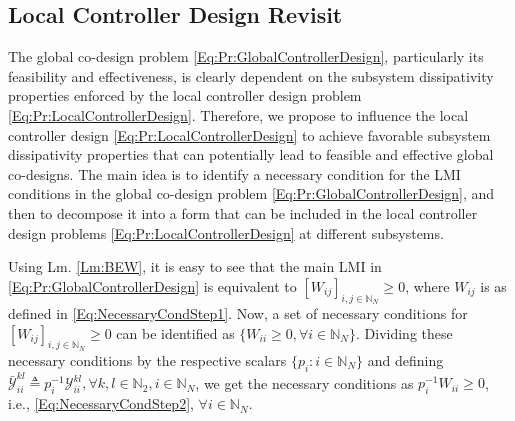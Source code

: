 \documentclass[letterpaper, 10 pt, conference]{ieeeconf}%
\newcommand{\N}{\mathbb{N}}
\newcommand{\0}{\mathbf{0}}
\newcommand{\Y}{\mathcal{Y}}
\newtheorem{remark}{\textbf{Remark}}
\begin{document}




\subsection{Local Controller Design Revisit}

The global co-design problem \eqref{Eq:Pr:GlobalControllerDesign}, particularly its feasibility and effectiveness, is clearly dependent on the subsystem dissipativity properties enforced by the local controller design problem \eqref{Eq:Pr:LocalControllerDesign}. Therefore, we propose to influence the local controller design \eqref{Eq:Pr:LocalControllerDesign} to achieve favorable subsystem dissipativity properties that can potentially lead to feasible and effective global co-designs. The main idea is to identify a necessary condition for the LMI conditions in the global co-design problem \eqref{Eq:Pr:GlobalControllerDesign}, and then to decompose it into a form that can be included in the local controller design problems \eqref{Eq:Pr:LocalControllerDesign} at different subsystems. 



Using Lm. \ref{Lm:BEW}, it is easy to see that the main LMI in \eqref{Eq:Pr:GlobalControllerDesign} is equivalent to $[W_{ij}]_{i,j\in\N_N} \geq 0$, where $W_{ij}$ is as defined in \eqref{Eq:NecessaryCondStep1}. Now, a set of necessary conditions for $[W_{ij}]_{i,j\in\N_N} \geq 0$ can be identified as $\{W_{ii} \geq 0, \forall i\in\N_N\}$. Dividing these necessary conditions by the respective scalars $\{p_i: i\in\N_N\}$ and defining $\bar{\Y}^{kl}_{ii} \triangleq p_i^{-1}\Y^{kl}_{ii}, \forall k,l\in\N_2, i\in\N_N$, we get the necessary conditions as $p_i^{-1}W_{ii} \geq 0$, i.e., \eqref{Eq:NecessaryCondStep2}, $\forall i\in\N_N$.
\end{document}
